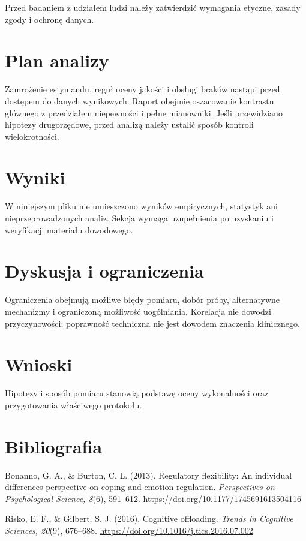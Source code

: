 \documentclass[11pt,a4paper]{article}
\begin{document}
Przed badaniem z udziałem ludzi należy zatwierdzić wymagania etyczne, zasady zgody i ochronę danych.

\section{Plan analizy}

Zamrożenie estymandu, reguł oceny jakości i obsługi braków nastąpi przed dostępem do danych wynikowych. Raport obejmie oszacowanie kontrastu głównego z przedziałem niepewności i pełne mianowniki. Jeśli przewidziano hipotezy drugorzędowe, przed analizą należy ustalić sposób kontroli wielokrotności.

\section{Wyniki}

W niniejszym pliku nie umieszczono wyników empirycznych, statystyk ani nieprzeprowadzonych analiz. Sekcja wymaga uzupełnienia po uzyskaniu i weryfikacji materiału dowodowego.

\section{Dyskusja i ograniczenia}

Ograniczenia obejmują możliwe błędy pomiaru, dobór próby, alternatywne mechanizmy i ograniczoną możliwość uogólniania. Korelacja nie dowodzi przyczynowości; poprawność techniczna nie jest dowodem znaczenia klinicznego.

\section{Wnioski}

Hipotezy i sposób pomiaru stanowią podstawę oceny wykonalności oraz przygotowania właściwego protokołu.

\section*{Bibliografia}

{\setlength{\parindent}{0pt}
\setlength{\parskip}{5pt}
\hangindent=1.27cm
Bonanno, G. A., \& Burton, C. L. (2013). Regulatory flexibility: An individual differences perspective on coping and emotion regulation. \textit{Perspectives on Psychological Science, 8}(6), 591--612. \url{https://doi.org/10.1177/1745691613504116}\par
\hangindent=1.27cm
Risko, E. F., \& Gilbert, S. J. (2016). Cognitive offloading. \textit{Trends in Cognitive Sciences, 20}(9), 676--688. \url{https://doi.org/10.1016/j.tics.2016.07.002}\par
}
\end{document}
